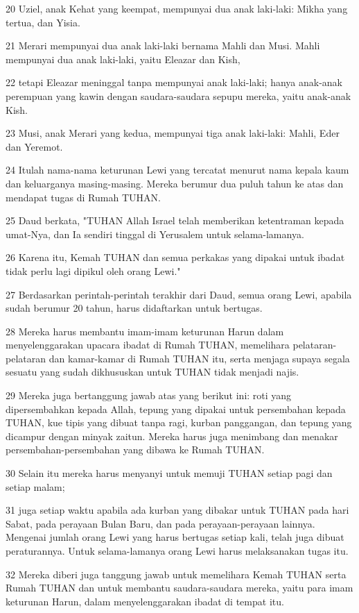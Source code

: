 \par 20 Uziel, anak Kehat yang keempat, mempunyai dua anak laki-laki: Mikha yang tertua, dan Yisia.
\par 21 Merari mempunyai dua anak laki-laki bernama Mahli dan Musi. Mahli mempunyai dua anak laki-laki, yaitu Eleazar dan Kish,
\par 22 tetapi Eleazar meninggal tanpa mempunyai anak laki-laki; hanya anak-anak perempuan yang kawin dengan saudara-saudara sepupu mereka, yaitu anak-anak Kish.
\par 23 Musi, anak Merari yang kedua, mempunyai tiga anak laki-laki: Mahli, Eder dan Yeremot.
\par 24 Itulah nama-nama keturunan Lewi yang tercatat menurut nama kepala kaum dan keluarganya masing-masing. Mereka berumur dua puluh tahun ke atas dan mendapat tugas di Rumah TUHAN.
\par 25 Daud berkata, "TUHAN Allah Israel telah memberikan ketentraman kepada umat-Nya, dan Ia sendiri tinggal di Yerusalem untuk selama-lamanya.
\par 26 Karena itu, Kemah TUHAN dan semua perkakas yang dipakai untuk ibadat tidak perlu lagi dipikul oleh orang Lewi."
\par 27 Berdasarkan perintah-perintah terakhir dari Daud, semua orang Lewi, apabila sudah berumur 20 tahun, harus didaftarkan untuk bertugas.
\par 28 Mereka harus membantu imam-imam keturunan Harun dalam menyelenggarakan upacara ibadat di Rumah TUHAN, memelihara pelataran-pelataran dan kamar-kamar di Rumah TUHAN itu, serta menjaga supaya segala sesuatu yang sudah dikhususkan untuk TUHAN tidak menjadi najis.
\par 29 Mereka juga bertanggung jawab atas yang berikut ini: roti yang dipersembahkan kepada Allah, tepung yang dipakai untuk persembahan kepada TUHAN, kue tipis yang dibuat tanpa ragi, kurban panggangan, dan tepung yang dicampur dengan minyak zaitun. Mereka harus juga menimbang dan menakar persembahan-persembahan yang dibawa ke Rumah TUHAN.
\par 30 Selain itu mereka harus menyanyi untuk memuji TUHAN setiap pagi dan setiap malam;
\par 31 juga setiap waktu apabila ada kurban yang dibakar untuk TUHAN pada hari Sabat, pada perayaan Bulan Baru, dan pada perayaan-perayaan lainnya. Mengenai jumlah orang Lewi yang harus bertugas setiap kali, telah juga dibuat peraturannya. Untuk selama-lamanya orang Lewi harus melaksanakan tugas itu.
\par 32 Mereka diberi juga tanggung jawab untuk memelihara Kemah TUHAN serta Rumah TUHAN dan untuk membantu saudara-saudara mereka, yaitu para imam keturunan Harun, dalam menyelenggarakan ibadat di tempat itu.

